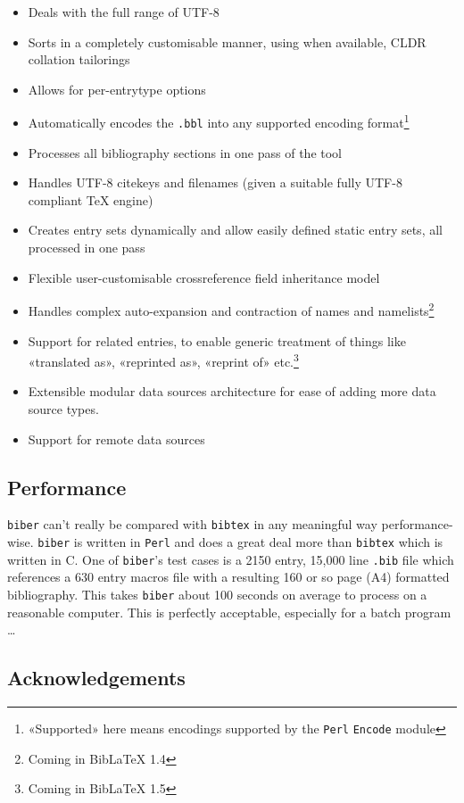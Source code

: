\documentclass{ltxdockit}
\begin{document}
\begin{itemize}
\item Deals with the full range of UTF-8
\item Sorts in a completely customisable manner, using when available,
  CLDR collation tailorings
\item Allows for per-entrytype options
\item Automatically encodes the \verb+.bbl+ into any supported encoding
  format\footnote{«Supported» here means encodings supported by the
    \texttt{Perl} \texttt{Encode} module}
\item Processes all bibliography sections in one pass of the tool
\item Handles UTF-8 citekeys and filenames (given a suitable fully
  UTF-8 compliant TeX engine)
\item Creates entry sets dynamically and allow easily defined static entry sets,
  all processed in one pass
\item Flexible user-customisable crossreference field inheritance
  model
\item Handles complex auto-expansion and contraction of names and
  namelists\footnote{Coming in BibLaTeX 1.4}
\item Support for related entries, to enable generic treatment of things
  like «translated as», «reprinted as», «reprint of»
  etc.\footnote{Coming in BibLaTeX 1.5}
\item Extensible modular data sources architecture for ease of adding
  more data source types.
\item Support for remote data sources
\end{itemize}

\subsection{Performance}

\verb+biber+ can't really be compared with \verb+bibtex+ in any meaningful
way performance-wise. \verb+biber+ is written in \verb+Perl+ and does a
great deal more than \verb+bibtex+ which is written in C. One of
\verb+biber+'s test cases is a 2150 entry, 15,000 line \verb+.bib+ file
which references a 630 entry macros file with a resulting 160 or so page (A4)
formatted bibliography. This takes \verb+biber+ about 100 seconds on
average to process on a reasonable computer. This is perfectly acceptable,
especially for a batch program \ldots

\subsection{Acknowledgements}
\end{document}
